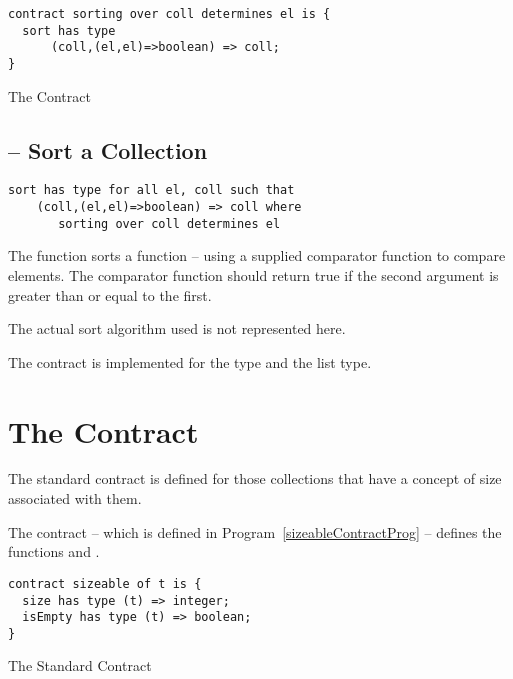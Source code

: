 \begin{program}[H]
\begin{lstlisting}
contract sorting over coll determines el is {
  sort has type 
      (coll,(el,el)=>boolean) => coll;
}
\end{lstlisting}
\caption{The  Contract\label{sortContractProg}}
\end{program}

\subsection{ -- Sort a Collection}
\label{sortFunction}
\begin{lstlisting}
sort has type for all el, coll such that
    (coll,(el,el)=>boolean) => coll where
       sorting over coll determines el
\end{lstlisting}

The  function sorts a function -- using a supplied comparator function to compare elements. The comparator function should return true if the second argument is greater than or equal to the first.

\begin{aside}
The actual sort algorithm used is not represented here.
\end{aside}

The  contract is implemented for the  type and the  list type.

\section{The  Contract}
\label{sizeableContract}
The standard  contract is defined for those collections that have a concept of size associated with them.


The  contract -- which is defined in Program~\vref{sizeableContractProg} -- defines the functions  and .

\begin{program}
\begin{lstlisting}
contract sizeable of t is {
  size has type (t) => integer;
  isEmpty has type (t) => boolean;
}
\end{lstlisting}
\caption{The Standard  Contract\label{sizeableContractProg}}
\end{program}

